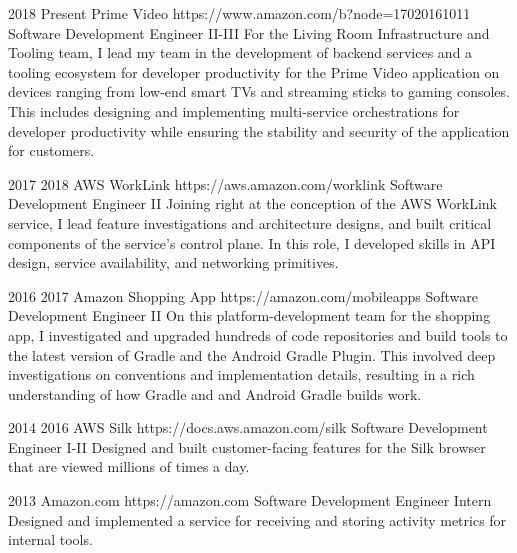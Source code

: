 \job
{2018} {Present}
{Prime Video} {https://www.amazon.com/b?node=17020161011}
{Software Development Engineer II-III}
{
    For the Living Room Infrastructure and Tooling team, I lead my team in the development of backend services and a tooling ecosystem for developer productivity for the Prime Video application on devices ranging from low-end smart TVs and streaming sticks to gaming consoles. This includes designing and implementing multi-service orchestrations for developer productivity while ensuring the stability and security of the application for customers.
}

\job
{2017} {2018}
{AWS WorkLink} {https://aws.amazon.com/worklink}
{Software Development Engineer II}
{
    Joining right at the conception of the AWS WorkLink service, I lead feature investigations and architecture designs, and built critical components of the service's control plane. In this role, I developed skills in API design, service availability, and networking primitives.
}

\job
{2016} {2017}
{Amazon Shopping App} {https://amazon.com/mobileapps}
{Software Development Engineer II}
{
    On this platform-development team for the shopping app, I investigated and upgraded hundreds of code repositories and build tools to the latest version of  {Gradle} and the  {Android Gradle Plugin}. This involved deep investigations on conventions and implementation details, resulting in a rich understanding of how Gradle and and Android Gradle builds work.
}

\job
{2014} {2016}
{AWS Silk} {https://docs.aws.amazon.com/silk}
{Software Development Engineer I-II}
{
    Designed and built customer-facing features for the Silk browser that are viewed millions of times a day.
}

\job
{2013} {}
{Amazon.com} {https://amazon.com}
{Software Development Engineer Intern}
{
    Designed and implemented a service for receiving and storing activity metrics for internal tools.
}
